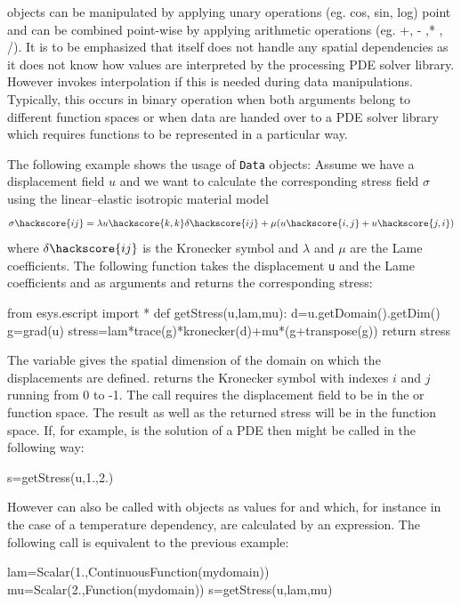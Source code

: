 \Data objects can be manipulated by applying unary operations (eg. cos, sin, log) point
and can be combined point-wise by applying arithmetic operations (eg. +, - ,* , /). 
It is to be emphasized that \escript itself does not handle any spatial dependencies as 
it does not know how values are interpreted by the processing PDE solver library. 
However \escript invokes interpolation if this is needed during data manipulations. 
Typically, this occurs in binary operation when both arguments belong to different
function spaces or when data are handed over to a PDE solver library 
which requires functions to be represented in a particular way. 

The following example shows the usage of {\tt Data} objects: Assume we have a
displacement field $u$ and we want to calculate the corresponding stress field
$\sigma$ using the linear--elastic isotropic material model
\begin{eqnarray}\label{eq: linear elastic stress}
\sigma\hackscore {ij}=\lambda u\hackscore {k,k} \delta\hackscore {ij} + \mu ( u\hackscore {i,j} + u\hackscore {j,i})
\end{eqnarray}
where $\delta\hackscore {ij}$ is the Kronecker symbol and 
$\lambda$ and $\mu$ are the Lame coefficients. The following function
takes the displacement {\tt u} and the Lame coefficients
 and  as arguments and returns the corresponding stress:
\begin{python}
  from esys.escript import *
  def getStress(u,lam,mu):
    d=u.getDomain().getDim()
    g=grad(u)
    stress=lam*trace(g)*kronecker(d)+mu*(g+transpose(g))
    return stress     
\end{python}
The variable 
 gives the spatial dimension of the 
domain on which the displacements are defined.
 returns the Kronecker symbol with indexes 
$i$ and $j$ running from $0$ to -1. The call  requires 
the displacement field  to be in the  or \ContinuousFunction
function space. The result  as well as the returned stress will be in the \Function function space. 
If, for example,  is the solution of a PDE then  might be called
in the following way:
\begin{python}
  s=getStress(u,1.,2.)
\end{python}
However  can also be called with \Data objects as values for
 and  which,
for instance in the case of a temperature dependency, are calculated by an expression. 
The following call is equivalent to the previous example:
\begin{python}
  lam=Scalar(1.,ContinuousFunction(mydomain))
  mu=Scalar(2.,Function(mydomain))
  s=getStress(u,lam,mu)
\end{python}

